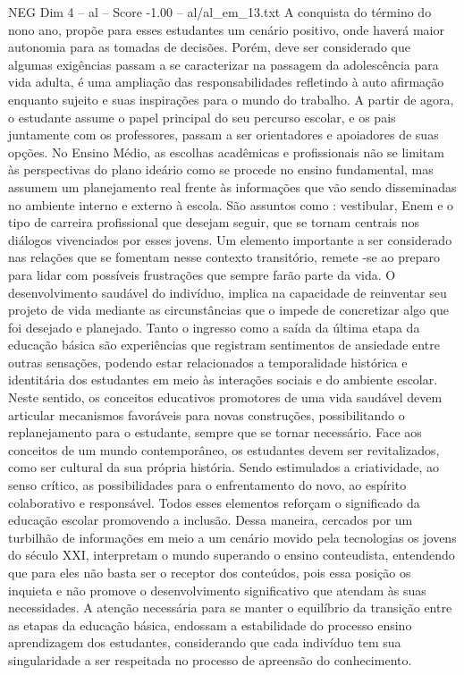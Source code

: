\begin{textsample}{NEG Dim 4 – al – Score -1.00 – al/al\_em\_13.txt}
A conquista do término do nono ano, propõe para esses estudantes um cenário positivo, onde haverá maior autonomia para as tomadas de decisões.
Porém, deve ser considerado que algumas exigências passam a se caracterizar na passagem da adolescência para vida adulta, é uma ampliação das responsabilidades refletindo à auto afirmação enquanto sujeito e suas inspirações para o mundo do trabalho.
A partir de agora, o estudante assume o papel principal do seu percurso escolar, e os pais juntamente com os professores, passam a ser orientadores e apoiadores de suas opções.
No Ensino Médio, as escolhas acadêmicas e profissionais não se limitam às perspectivas do plano ideário como se procede no ensino fundamental, mas assumem um planejamento real frente às informações que vão sendo disseminadas no ambiente interno e externo à escola.
São assuntos como : vestibular, Enem e o tipo de carreira profissional que desejam seguir, que se tornam centrais nos diálogos vivenciados por esses jovens.
Um elemento importante a ser considerado nas relações que se fomentam nesse contexto transitório, remete -se ao preparo para lidar com possíveis frustrações que sempre farão parte da vida.
O desenvolvimento saudável do indivíduo, implica na capacidade de reinventar seu projeto de vida mediante as circunstâncias que o impede de concretizar algo que foi desejado e planejado.
Tanto o ingresso como a saída da última etapa da educação básica são experiências que registram sentimentos de ansiedade entre outras sensações, podendo estar relacionados a temporalidade histórica e identitária dos estudantes em meio às interações sociais e do ambiente escolar.
Neste sentido, os conceitos educativos promotores de uma vida saudável devem articular mecanismos favoráveis para novas construções, possibilitando o replanejamento para o estudante, sempre que se tornar necessário.
Face aos conceitos de um mundo contemporâneo, os estudantes devem ser revitalizados, como ser cultural da sua própria história.
Sendo estimulados a criatividade, ao senso crítico, as possibilidades para o enfrentamento do novo, ao espírito colaborativo e responsável.
Todos esses elementos reforçam o significado da educação escolar promovendo a inclusão.
Dessa maneira, cercados por um turbilhão de informações em meio a um cenário movido pela tecnologias os jovens do século XXI, interpretam o mundo superando o ensino conteudista, entendendo que para eles não basta ser o receptor dos conteúdos, pois essa posição os inquieta e não promove o desenvolvimento significativo que atendam às suas necessidades.
A atenção necessária para se manter o equilíbrio da transição entre as etapas da educação básica, endossam a estabilidade do processo ensino aprendizagem dos estudantes, considerando que cada indivíduo tem sua singularidade a ser respeitada no processo de apreensão do conhecimento.

\end{textsample}
